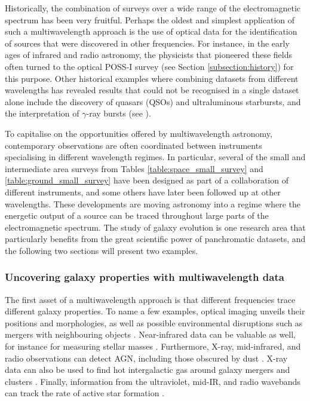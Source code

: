 Historically, the combination of surveys over a wide range of the electromagnetic spectrum has been very fruitful. Perhaps the oldest and simplest application of such a multiwavelength approach is the use of optical data for the identification of sources that were discovered in other frequencies. For instance, in the early ages of infrared and radio astronomy, the physicists that pioneered these fields often turned to the optical POSS-I survey (see Section \ref{subsection:history}) for this purpose. Other historical examples where combining datasets from different wavelengths has revealed results that could not be recognised in a single dataset alone include the discovery of quasars (QSOs) and ultraluminous starbursts, and the interpretation of $\gamma$-ray bursts (see \citealt{2013pss2.book..223D}). \par


To capitalise on the opportunities offered by multiwavelength astronomy, contemporary observations are often coordinated between instruments specialising in different wavelength regimes. In particular, several of the small and intermediate area surveys from Tables \ref{table:space_small_survey} and \ref{table:ground_small_survey} have been designed as part of a collaboration of different instruments, and some others have later been followed up at other wavelengths. These developments are moving astronomy into a regime where the energetic output of a source can be traced throughout large parts of the electromagnetic spectrum. The study of galaxy evolution is one research area that particularly benefits from the great scientific power of panchromatic datasets, and the following two sections will present two examples. \par 

\subsubsection{Uncovering galaxy properties with multiwavelength data}
The first asset of a multiwavelength approach is that different frequencies trace different galaxy properties. To name a few examples, optical imaging unveils their positions and morphologies, as well as possible environmental disruptions such as mergers with neighbouring objects \citep{2010MNRAS.401.1043D,2017MNRAS.464.4176W}. Near-infrared data can be valuable as well, for instance for measuring stellar masses \citep{2003ApJS..149..289B}. Furthermore, X-ray, mid-infrared, and radio observations can detect AGN, including those obscured by dust \citep{2018ARA&A..56..625H}. X-ray data can also be used to find hot intergalactic gas around galaxy mergers and clusters \citep{2006ApJ...643..692C,2018MNRAS.475.2067B}. Finally, information from the ultraviolet, mid-IR, and radio wavebands can track the rate of active star formation \citep{2017ApJ...847..136B}. \par 

